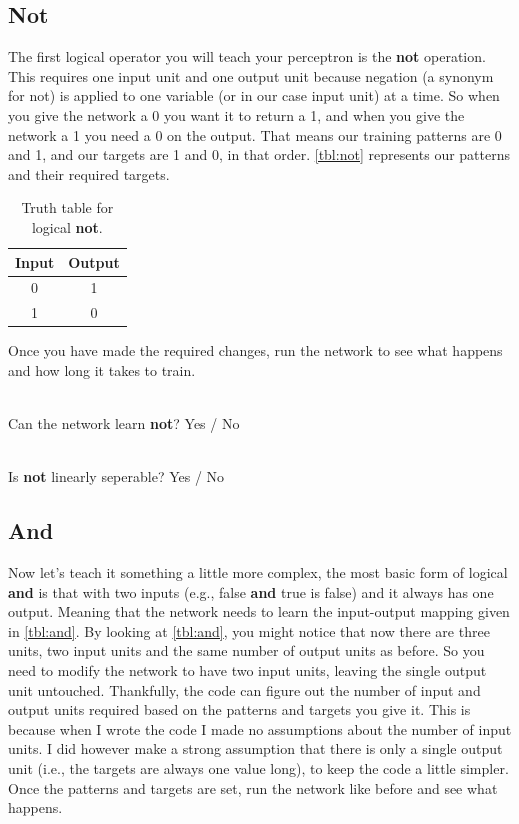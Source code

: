 \documentclass[a4paper,10pt]{article}
\begin{document}
\subsection{Not}

The first logical operator you will teach your perceptron is the \textbf{not} operation. This requires one input unit and one output unit because negation (a synonym for not) is applied to one variable (or in our case input unit) at a time. So when you give the network a 0 you want it to return a 1, and when you give the network a 1 you need a 0 on the output. That means our training patterns are 0 and 1, and our targets are 1 and 0, in that order. \autoref{tbl:not} represents our patterns and their required targets. 

\begin{table}[htb]
 \centering
 \begin{tabular}[t]{cc}
Input & Output\\ \hline
0 & 1\\
1 & 0
\end{tabular} \caption{Truth table for logical \textbf{not}.}
 \label{tbl:not}
\end{table}

Once you have made the required changes, run the network to see what happens and how long it takes to train. 

\ \\ Can the network learn \textbf{not}?    Yes / No           

\ \\ Is \textbf{not} linearly seperable? Yes / No
                                                     

\subsection{And}

Now let's teach it something a little more complex, the most basic form of logical \textbf{and} is that with two inputs (e.g., false \textbf{and} true is false) and it always has one output. Meaning that the network needs to learn the input-output mapping given in \autoref{tbl:and}. By looking at \autoref{tbl:and}, you might notice that now there are three units, two input units and the same number of output units as before. So you need to modify the network to have two input units, leaving the single output unit untouched. Thankfully, the code can figure out the number of input and output units required based on the patterns and targets you give it. This is because when I wrote the code I made no assumptions about the number of input units. I did however make a strong assumption that there is only a single output unit (i.e., the targets are always one value long), to keep the code a little simpler. 
Once the patterns and targets are set, run the network like before and see what happens.
\end{document}
